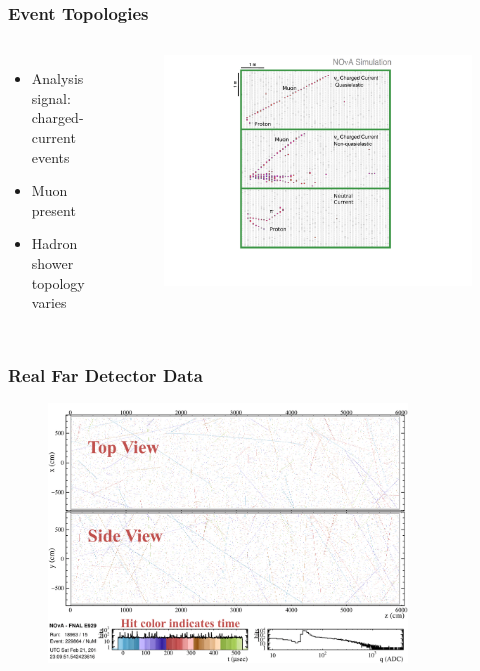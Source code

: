 \documentclass[10pt,professionalfonts,xcolor=table]{beamer}
\begin{document}
\frame
{
  \frametitle{Event Topologies}
\begin{columns}[]
\begin{itemize}
\item Analysis signal: \numu charged-current events
\gap
\item Muon present
\gap
\item Hadron shower topology varies
\end{itemize}
 \begin{figure} \includegraphics[width=\textwidth]{figures/figures/event_topology_numu.pdf} \end{figure}

\end{columns}

}


\frame
{
  \frametitle{Real Far Detector Data}

 \begin{figure} \includegraphics[width=0.85\textwidth]{figures/evd_steps/evd_top_side.png} \end{figure}
 \centering \footnotesize $~$

}
\end{document}
